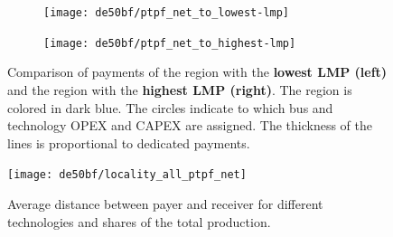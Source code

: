 \documentclass[11pt,twocolumn]{article}
\begin{document}
\begin{figure}
    \centering
    \begin{subfigure}[c]{.6\linewidth}
    \texttt{[image: de50bf/ptpf\_net\_to\_lowest-lmp]}
    \end{subfigure}
    \hspace{-.2151\linewidth}
    \begin{subfigure}[c]{.6\linewidth}
    \texttt{[image: de50bf/ptpf\_net\_to\_highest-lmp]}
    \end{subfigure}
    \caption{Comparison of payments of the region with the \textbf{lowest LMP (left)} and the region with the \textbf{highest LMP (right)}. The region is colored in dark blue. The circles indicate to which bus and technology OPEX and CAPEX are assigned. The thickness of the lines is proportional to dedicated payments.}
    \label{fig:direct-allocation}
\end{figure}


\begin{figure}
    \centering
    \texttt{[image: de50bf/locality\_all\_ptpf\_net]}
    \caption{Average distance between payer and receiver for different technologies and shares of the total production.}
    \label{fig:locality}
\end{figure}
\end{document}
